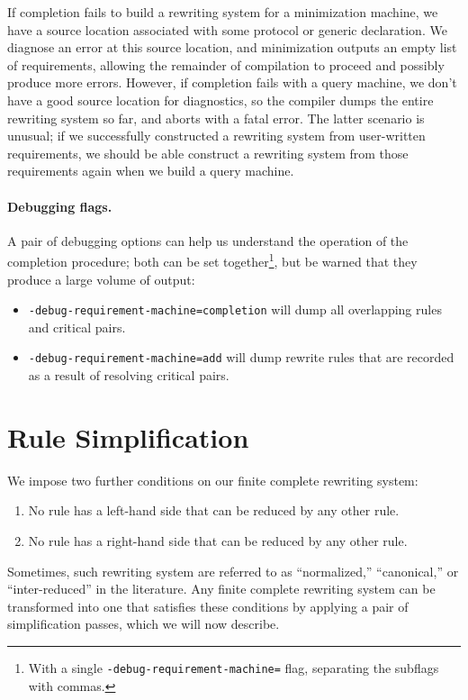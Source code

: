 \documentclass[../generics]{subfiles}
\begin{document}
If completion fails to build a rewriting system for a minimization machine, we have a source location associated with some protocol or generic declaration. We diagnose an error at this source location, and minimization outputs an empty list of requirements, allowing the remainder of compilation to proceed and possibly produce more errors. However, if completion fails with a query machine, we don't have a good source location for diagnostics, so the compiler dumps the entire rewriting system so far, and aborts with a fatal error. The latter scenario is unusual; if we successfully constructed a rewriting system from user-written requirements, we should be able construct a rewriting system from those requirements again when we build a query machine.

\paragraph{Debugging flags.}
A pair of debugging options can help us understand the operation of the completion procedure; both can be set together\footnote{With a single \texttt{-debug-requirement-machine=} flag, separating the subflags with commas.}, but be warned that they produce a large volume of output:
\begin{itemize}
\item {} \texttt{-debug-requirement-machine=completion} will dump all overlapping rules and critical pairs.
\item {} \texttt{-debug-requirement-machine=add} will dump rewrite rules that are recorded as a result of resolving critical pairs.
\end{itemize}

\section{Rule Simplification}\label{sec:rule simplification}

We impose two further conditions on our finite complete rewriting system:
\begin{enumerate}
\item No rule has a left-hand side that can be reduced by any other rule.
\item No rule has a right-hand side that can be reduced by any other rule.
\end{enumerate}
Sometimes, such rewriting system are referred to as ``normalized,'' ``canonical,'' or ``inter-reduced'' in the literature. Any finite complete rewriting system can be transformed into one that satisfies these conditions by applying a pair of simplification passes, which we will now describe.
\end{document}
